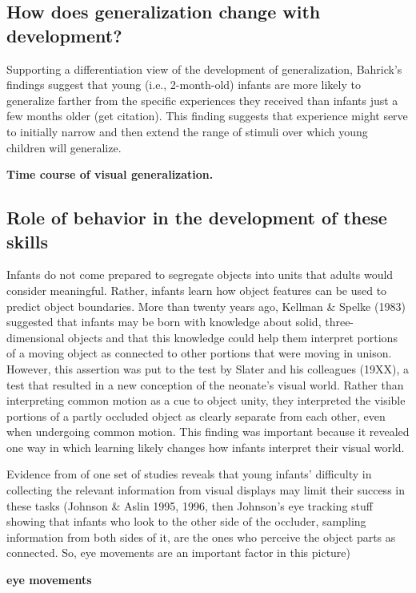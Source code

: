 \subsection{How does generalization change with development?}

Supporting a differentiation view of the development of
generalization, Bahrick's findings suggest that young (i.e.,
2-month-old) infants are more likely to generalize farther from the
specific experiences they received than infants just a few months
older (get citation).  This finding suggests that experience might
serve to initially narrow and then extend the range of stimuli over
which young children will generalize.

{
\bf Time course of visual generalization.
}

\subsection{Role of behavior in the development of these skills}

Infants do not come prepared to segregate objects into units that
adults would consider meaningful.  Rather, infants learn how object
features can be used to predict object boundaries.  More than twenty
years ago, Kellman \& Spelke (1983) suggested that infants may be born
with knowledge about solid, three-dimensional objects and that this
knowledge could help them interpret portions of a moving object as
connected to other portions that were moving in unison.  However, this
assertion was put to the test by Slater and his colleagues (19XX), a
test that resulted in a new conception of the neonate's visual
world.  Rather than interpreting common motion as a cue to object
unity, they interpreted the visible portions of a partly occluded
object as clearly separate from each other, even when undergoing
common motion.  This finding was important because it revealed one way
in which learning likely changes how infants interpret their visual
world.

Evidence from of one set of studies reveals that young
infants' difficulty in collecting the relevant information
from visual displays may limit their success in these tasks (Johnson \&
Aslin 1995, 1996, then Johnson's eye tracking stuff showing
that infants who look to the other side of the occluder, sampling
information from both sides of it, are the ones who perceive the
object parts as connected.  So, eye movements are an important factor
in this picture)

{\bf eye movements}

